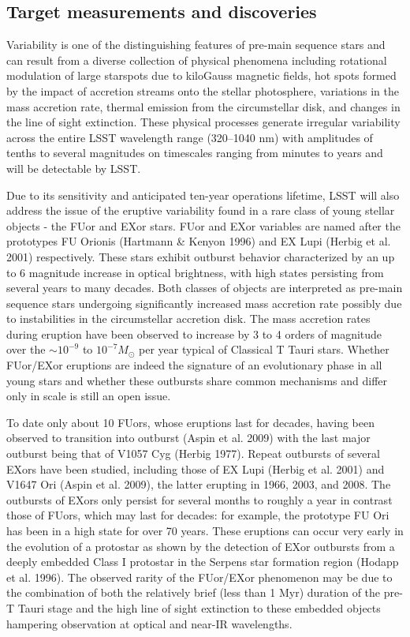 
\subsection{Target measurements and discoveries}
\label{sec:\secname:targets}


Variability is one of the distinguishing features of pre-main sequence stars and can result from a
diverse collection of physical phenomena including rotational modulation of large starspots due to
kiloGauss magnetic fields, hot spots formed by the impact of accretion streams onto the stellar
photosphere, variations in the mass accretion rate, thermal emission from the circumstellar disk,
and changes in the line of sight extinction. These physical processes generate irregular variability
across the entire LSST wavelength range (320–1040 nm) with amplitudes of tenths to several
magnitudes on timescales ranging from minutes to years and will be detectable by LSST.

Due to its sensitivity and anticipated ten-year operations lifetime, LSST will also address the issue
of the eruptive variability found in a rare class of young stellar objects - the FUor and EXor stars.
FUor and EXor variables are named after the prototypes FU Orionis (Hartmann & Kenyon 1996)
and EX Lupi (Herbig et al. 2001) respectively. These stars exhibit outburst behavior characterized
by an up to 6 magnitude increase in optical brightness, with high states persisting from several years
to many decades. Both classes of objects are interpreted as pre-main sequence stars undergoing
significantly increased mass accretion rate possibly due to instabilities in the circumstellar accretion
disk. The mass accretion rates during eruption have been observed to increase by 3 to 4 orders
of magnitude over the $\sim 10^{-9}$
to $10^{-7} M_{\odot}$ per year typical of Classical T Tauri stars. Whether
FUor/EXor eruptions are indeed the signature of an evolutionary phase in all young stars and
whether these outbursts share common mechanisms and differ only in scale is still an open issue.

To date only about 10 FUors, whose eruptions last for decades, having been observed to transition
into outburst (Aspin et al. 2009) with the last major outburst being that of V1057 Cyg (Herbig
1977). Repeat outbursts of several EXors have been studied, including those of EX Lupi (Herbig
et al. 2001) and V1647 Ori (Aspin et al. 2009), the latter erupting in 1966, 2003, and 2008. The
outbursts of EXors only persist for several months to roughly a year in contrast those of FUors,
which may last for decades: for example, the prototype FU Ori has been in a high state for over
70 years. These eruptions can occur very early in the evolution of a protostar as shown by the
detection of EXor outbursts from a deeply embedded Class I protostar in the Serpens star formation
region (Hodapp et al. 1996). The observed rarity of the FUor/EXor phenomenon may be due to
the combination of both the relatively brief (less than 1 Myr) duration of the pre-T Tauri stage
and the high line of sight extinction to these embedded objects hampering observation at optical
and near-IR wavelengths.

